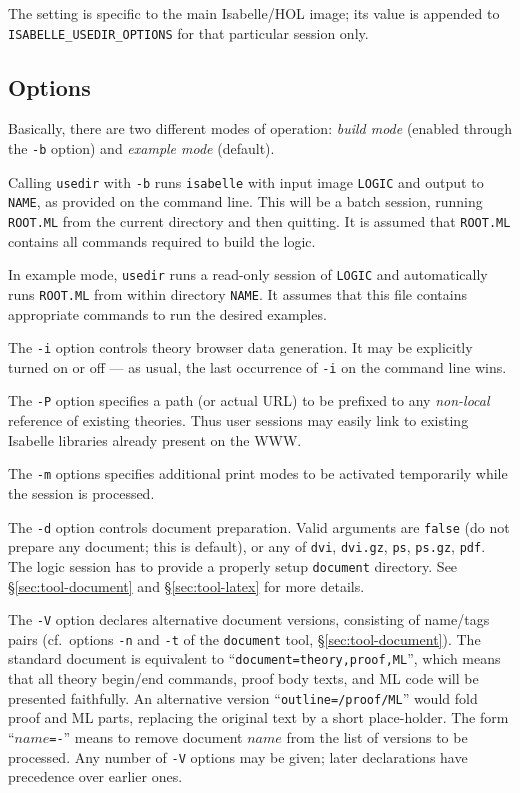 The  setting is specific to the main
Isabelle/HOL image; its value is appended to
\verb,ISABELLE_USEDIR_OPTIONS, for that particular session only.


\subsection*{Options}

Basically, there are two different modes of operation: \emph{build mode}
(enabled through the \texttt{-b} option) and \emph{example mode} (default).

Calling \texttt{usedir} with \texttt{-b} runs \texttt{isabelle} with input
image \texttt{LOGIC} and output to \texttt{NAME}, as provided on the command
line. This will be a batch session, running \texttt{ROOT.ML} from the current
directory and then quitting.  It is assumed that \texttt{ROOT.ML} contains all
{\ML} commands required to build the logic.

In example mode, \texttt{usedir} runs a read-only session of \texttt{LOGIC}
and automatically runs \texttt{ROOT.ML} from within directory \texttt{NAME}.
It assumes that this file contains appropriate {\ML} commands to run the
desired examples.

\medskip The \texttt{-i} option controls theory browser data generation. It
may be explicitly turned on or off --- as usual, the last occurrence of
\texttt{-i} on the command line wins.

The \texttt{-P} option specifies a path (or actual URL) to be prefixed to any
\emph{non-local} reference of existing theories.  Thus user sessions may
easily link to existing Isabelle libraries already present on the WWW.

The \texttt{-m} options specifies additional print modes to be activated
temporarily while the session is processed.

\medskip The \texttt{-d} option controls document preparation.  Valid
arguments are \texttt{false} (do not prepare any document; this is default),
or any of \texttt{dvi}, \texttt{dvi.gz}, \texttt{ps}, \texttt{ps.gz},
\texttt{pdf}.  The logic session has to provide a properly setup
\texttt{document} directory.  See \S\ref{sec:tool-document} and
\S\ref{sec:tool-latex} for more details.

\medskip The \texttt{-V} option declares alternative document versions,
consisting of name/tags pairs (cf.\ options \texttt{-n} and \texttt{-t} of the
\texttt{document} tool, \S\ref{sec:tool-document}).  The standard document is
equivalent to ``\texttt{document=theory,proof,ML}'', which means that all
theory begin/end commands, proof body texts, and ML code will be presented
faithfully.  An alternative version ``\texttt{outline=/proof/ML}'' would fold
proof and ML parts, replacing the original text by a short place-holder.  The
form ``$name$\verb,=-,'' means to remove document $name$ from the list of
versions to be processed.  Any number of \texttt{-V} options may be given;
later declarations have precedence over earlier ones.


